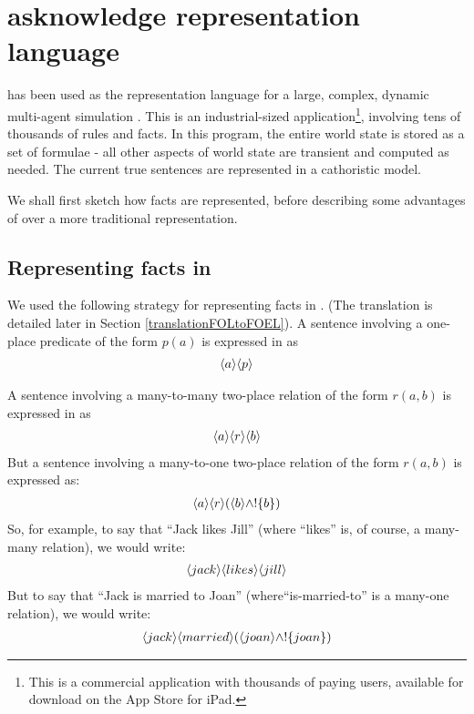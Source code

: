 \section{\Cathoristic{} asknowledge representation language}\label{kr}


\Cathoristic{} has been used as the representation language for a
large, complex, dynamic multi-agent simulation \cite{evans-and-short}.
This is an industrial-sized application\footnote{This is a commercial application with thousands of paying users, available for download on the App Store for iPad.}, involving tens of thousands
of rules and facts.  
In this program, the entire world state
is stored as a set of \cathoristic{} formulae - all other aspects of
world state are transient and computed as needed.  The current true
sentences are represented in a cathoristic model.

We shall first sketch how facts are represented, before describing some
advantages of \cathoristic{} over a more traditional \fol{}
representation.

\subsection{Representing facts  in \cathoristic{}}

We used the following strategy for representing facts in \cathoristic{}.  
(The translation is detailed later in Section
\ref{translationFOLtoFOEL}).  
A sentence involving a one-place predicate of the form $p(a)$ is
expressed in \cathoristic{} as
\begin{eqnarray*}
   \langle a \rangle \langle p \rangle \end{eqnarray*}

\NI A sentence involving a many-to-many two-place relation of the form
$r(a,b)$ is expressed in \cathoristic{} as
\begin{eqnarray*}
\langle a \rangle \langle r \rangle \langle b \rangle \end{eqnarray*}
But a sentence involving a many-to-one two-place relation of the form $r(a,b)$ is expressed as:
\begin{eqnarray*}
\langle a \rangle \langle r \rangle (\langle b \rangle \land ! \{b\})
\end{eqnarray*}
So, for example, to say that ``Jack likes Jill'' (where ``likes'' is, of course, a many-many relation), we would write:
\begin{eqnarray*}
\langle jack \rangle \langle likes \rangle \langle jill \rangle \end{eqnarray*}
But to say that ``Jack is married to Joan'' (where``is-married-to'' is a many-one relation), we would write:
\begin{eqnarray*}
\langle jack \rangle \langle married \rangle (\langle joan \rangle \land ! \{joan\})
\end{eqnarray*}

